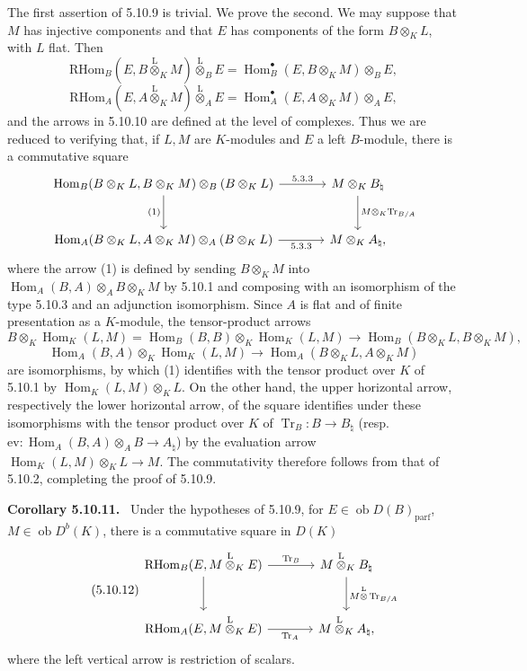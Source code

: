 \documentclass[11pt]{article}
\newenvironment{statement}[1]{\par\medskip\noindent\textbf{#1.}\ }{\par\medskip}
\DeclareMathOperator{\Hom}{Hom}
\newcommand{\ob}{\operatorname{ob}}
\providecommand{\RHom}{\mathrm{RHom}}
\providecommand{\Tr}{\operatorname{Tr}}
\providecommand{\Tr}{\operatorname{Tr}}
\providecommand{\lten}{\overset{\mathrm L}{\otimes}}
\providecommand{\Tr}{\operatorname{Tr}}
\providecommand{\RHom}{\mathrm{RHom}}
\providecommand{\Hom}{\operatorname{Hom}}
\providecommand{\ob}{\operatorname{ob}}
\providecommand{\lten}{\overset{\mathrm L}{\otimes}}
\providecommand{\RHom}{\mathrm R\mathcal{H}om}
\providecommand{\lten}{\overset{\mathrm L}{\otimes}}
\providecommand{\Tr}{\operatorname{Tr}}
\providecommand{\lten}{\overset{\mathrm L}{\otimes}}
\providecommand{\lten}{\overset{\mathrm L}{\otimes}}
\providecommand{\lten}{\overset{\mathrm L}{\otimes}}
\providecommand{\RHom}{\mathrm{RHom}}
\begin{document}
The first assertion of 5.10.9 is trivial. We prove the second. We may suppose that $M$ has injective components and that $E$ has components of the form $B\otimes_KL$, with $L$ flat. Then
\[
\RHom_B(E,B\lten_KM)\lten_BE=\Hom_B^\bullet(E,B\otimes_KM)\otimes_BE,
\]
\[
\RHom_A(E,A\lten_KM)\lten_AE=\Hom_A^\bullet(E,A\otimes_KM)\otimes_AE,
\]
and the arrows in 5.10.10 are defined at the level of complexes. Thus we are reduced to verifying that, if $L,M$ are $K$-modules and $E$ a left $B$-module, there is a commutative square
\[
\begin{tikzcd}[column sep=large,row sep=large]
\Hom_B(B\otimes_KL,B\otimes_KM)\otimes_B(B\otimes_KL) \arrow[r,"5.3.3"] \arrow[d,"(1)"'] & M\otimes_KB_\natural \arrow[d,"M\otimes_K\Tr_{B/A}"]\\
\Hom_A(B\otimes_KL,A\otimes_KM)\otimes_A(B\otimes_KL) \arrow[r,"5.3.3"'] & M\otimes_KA_\natural,
\end{tikzcd}
\]
where the arrow (1) is defined by sending $B\otimes_KM$ into $\Hom_A(B,A)\otimes_AB\otimes_KM$ by 5.10.1 and composing with an isomorphism of the type 5.10.3 and an adjunction isomorphism. Since $A$ is flat and of finite presentation as a $K$-module, the tensor-product arrows
\[
B\otimes_K\Hom_K(L,M)=\Hom_B(B,B)\otimes_K\Hom_K(L,M)\to\Hom_B(B\otimes_KL,B\otimes_KM),
\]
\[
\Hom_A(B,A)\otimes_K\Hom_K(L,M)\to\Hom_A(B\otimes_KL,A\otimes_KM)
\]
are isomorphisms, by which (1) identifies with the tensor product over $K$ of 5.10.1 by $\Hom_K(L,M)\otimes_KL$. On the other hand, the upper horizontal arrow, respectively the lower horizontal arrow, of the square identifies under these isomorphisms with the tensor product over $K$ of $\Tr_B:B\to B_\natural$ (resp. $\mathrm{ev}:\Hom_A(B,A)\otimes_AB\to A_\natural$) by the evaluation arrow $\Hom_K(L,M)\otimes_KL\to M$. The commutativity therefore follows from that of 5.10.2, completing the proof of 5.10.9.

\begin{statement}{Corollary 5.10.11}
Under the hypotheses of 5.10.9, for $E\in\ob D(B)_{\mathrm{parf}}$, $M\in\ob D^b(K)$, there is a commutative square in $D(K)$
\begin{equation}\tag{5.10.12}
\begin{tikzcd}[column sep=large,row sep=large]
\RHom_B(E,M\lten_KE) \arrow[r,"\Tr_B"] \arrow[d] & M\lten_KB_\natural \arrow[d,"M\lten\Tr_{B/A}"]\\
\RHom_A(E,M\lten_KE) \arrow[r,"\Tr_A"'] & M\lten_KA_\natural,
\end{tikzcd}
\end{equation}
where the left vertical arrow is restriction of scalars.
\end{statement}
\end{document}
